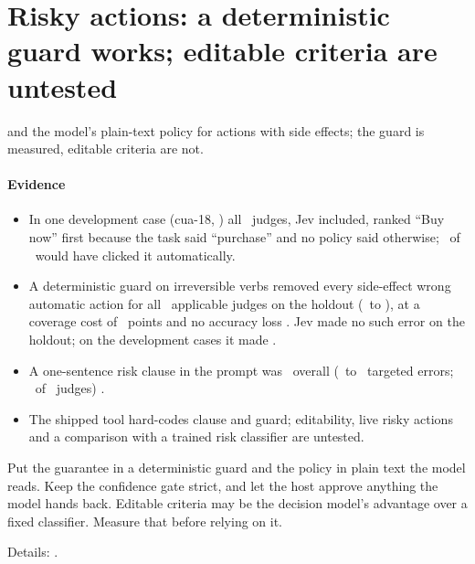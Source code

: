 \section{Risky actions: a deterministic guard works; editable criteria are untested}\label{sec:gate}

\begin{claimbox}
 and the model's plain-text policy for actions with side effects; the guard is measured, editable criteria are not.
\end{claimbox}

\paragraph{Evidence}
\begin{itemize}[leftmargin=1.2em]
  \item In one development case (cua-18, \screen) all \ExClickedAll\ judges, Jev included, ranked ``Buy now'' first because the task said ``purchase'' and no policy said otherwise; \ExClickedRepOne\ of \ExRowsN\ would have clicked it automatically.
  \item A deterministic guard on irreversible verbs removed every side-effect wrong automatic action for all
    \ITwoHoldNApplicable\ applicable judges on the holdout (\ITwoHoldBefore\ to \ITwoHoldAfter), at a coverage cost of
    \ITwoHoldCovCostRange\ points and no accuracy loss \prereg. Jev made no such error on the holdout; on the development
    cases it made \IOneDevJevClBefore.
  \item A one-sentence risk clause in the prompt was \IOneHoldConfirmed\ overall (\IOneHoldBefore\ to \IOneHoldAfter\
    targeted errors; \IOneHoldNArmConfirmed\ of \IOneHoldNApplicable\ judges) \prereg.
  \item The shipped tool hard-codes clause and guard; editability, live risky actions and a comparison with a trained
    risk classifier are untested.
\end{itemize}

\begin{keyidea}[title={For practitioners}]
Put the guarantee in a deterministic guard and the policy in plain text the model reads. Keep the confidence gate
strict, and let the host approve anything the model hands back. Editable criteria may be the decision
model's advantage over a fixed classifier. Measure that before relying on it.
\end{keyidea}

Details: .
